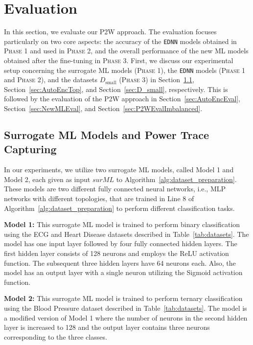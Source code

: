 \documentclass[letterpaper]{article}
\begin{document}
\section{Evaluation}
\label{sec:Evaluation}
In this section, we evaluate our P2W approach. The evaluation focuses particularly on two core aspects: the accuracy of the \texttt{EDNN} models obtained in \textsc{Phase 1} and used in \textsc{Phase 2},  and the overall performance of the new ML models obtained after the fine-tuning in \textsc{Phase 3}. First, we discuss our experimental setup concerning the surrogate ML models (\textsc{Phase 1}), the \texttt{EDNN} models (\textsc{Phase 1} and \textsc{Phase 2}), and the datasets $D_{\text{small}}$ (\textsc{Phase 3}) in Section~\ref{sec:SurrMLTop}, Section~\ref{sec:AutoEncTop}, and Section~\ref{sec:D_small}, respectively. This is followed by the evaluation of the P2W approach in Section~\ref{sec:AutoEncEval},  Section~\ref{sec:NewMLEval}, and Section~\ref{sec:P2WEvalImbalanced}. 

\subsection{Surrogate ML Models and Power Trace Capturing}
\label{sec:SurrMLTop}

In our experiments, we utilize two surrogate ML models, called Model 1 and Model 2, each given as input $surML$ to Algorithm~\ref{alg:dataset_preparation}. These models are two different fully connected neural networks, i.e., MLP networks with different topologies, that are trained in Line 8 of Algorithm~\ref{alg:dataset_preparation} to perform different classification tasks. 

\textbf{Model 1:} This surrogate ML model is trained to perform binary classification using the ECG and Heart Disease datasets described in Table~\ref{tab:datasets}. The model has one input layer followed by four fully connected hidden layers. The first hidden layer consists of 128 neurons and employs the ReLU activation function. The subsequent three hidden layers have 64 neurons each. Also, the model has an output layer with a single neuron utilizing the Sigmoid activation function.

\textbf{Model 2:} This surrogate ML model is trained to perform ternary classification using the Blood Pressure dataset described in Table~\ref{tab:datasets}. The model is a modified version of Model 1 where the number of neurons in the second hidden layer is increased to 128 and the output layer contains three neurons corresponding to the three classes.
  
\end{document}
